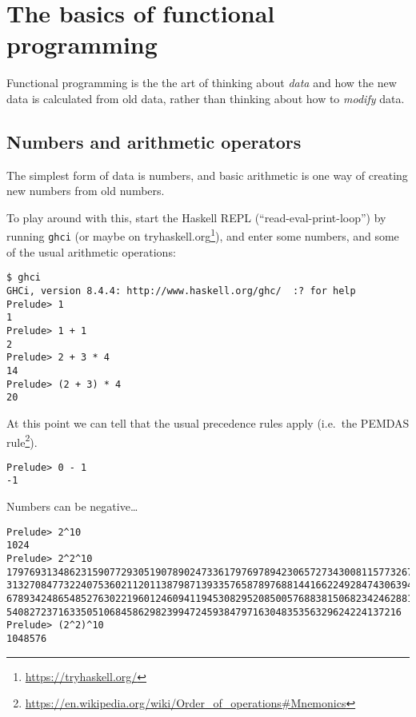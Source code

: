 \documentclass[11pt,
  american,
  DIV13]{article}
\DeclareRobustCommand{\href}[2]{#2\footnote{\url{#1}}}
\begin{document}
\newpage

\hypertarget{the-basics-of-functional-programming}{%
\section{The basics of functional
programming}\label{the-basics-of-functional-programming}}

Functional programming is the the art of thinking about \emph{data} and
how the new data is calculated from old data, rather than thinking about
how to \emph{modify} data.

\hypertarget{numbers-and-arithmetic-operators}{%
\subsection{Numbers and arithmetic
operators}\label{numbers-and-arithmetic-operators}}

The simplest form of data is numbers, and basic arithmetic is one way of
creating new numbers from old numbers.

To play around with this, start the Haskell REPL
(``read-eval-print-loop'') by running \texttt{ghci} (or maybe on
\href{https://tryhaskell.org/}{tryhaskell.org}), and enter some numbers,
and some of the usual arithmetic operations:

\begin{verbatim}
$ ghci
GHCi, version 8.4.4: http://www.haskell.org/ghc/  :? for help
Prelude> 1
1
Prelude> 1 + 1
2
Prelude> 2 + 3 * 4
14
Prelude> (2 + 3) * 4
20
\end{verbatim}

At this point we can tell that the usual precedence rules apply
(i.e.~the
\href{https://en.wikipedia.org/wiki/Order_of_operations\#Mnemonics}{PEMDAS
rule}).

\begin{verbatim}
Prelude> 0 - 1
-1
\end{verbatim}

Numbers can be negative\ldots{}

\begin{verbatim}
Prelude> 2^10
1024
Prelude> 2^2^10
17976931348623159077293051907890247336179769789423065727343008115773267580550096
31327084773224075360211201138798713933576587897688144166224928474306394741243777
67893424865485276302219601246094119453082952085005768838150682342462881473913110
540827237163350510684586298239947245938479716304835356329624224137216
Prelude> (2^2)^10
1048576
\end{verbatim}
\end{document}
